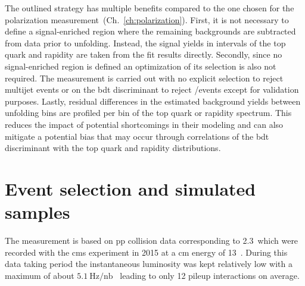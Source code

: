 The outlined strategy has multiple benefits compared to the one chosen for the polarization measurement~(Ch.~\ref{ch:polarization}). First, it is not necessary to define a signal-enriched region where the remaining backgrounds are subtracted from data prior to unfolding. Instead, the signal yields in intervals of the top quark \pt and rapidity are taken from the fit results directly. Secondly, since no signal-enriched region is defined an optimization of its selection is also not required. The measurement is carried out with no explicit selection to reject multijet events or on the \gls{bdt} discriminant to reject \wjets/\ttbar events except for validation purposes. Lastly, residual differences in the estimated background yields between unfolding bins are profiled per bin of the top quark \pt or rapidity spectrum. This reduces the impact of potential shortcomings in their modeling and can also mitigate a potential bias that may occur through correlations of the \gls{bdt} discriminant with the top quark \pt and rapidity distributions.



\section{Event selection and simulated samples}
\label{sec:diff13-selection}

The measurement is based on \gls{pp} collision data corresponding to 2.3~\invfb which were recorded with the \gls{cms} experiment in 2015 at a \acrlong{cm} energy of 13~\TeV. During this data taking period the instantaneous luminosity was kept relatively low with a maximum of about $5.1~\mathrm{Hz}/\mathrm{nb}$~\cite{lumipublic} leading to only 12 pileup interactions on average. 

